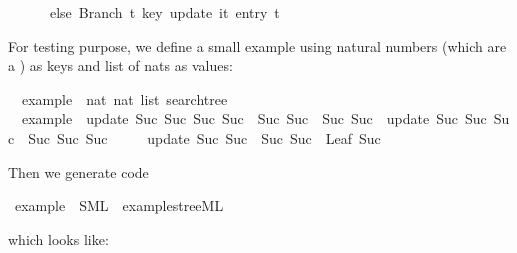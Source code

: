 \begin{isabellebody}
\ \ \ \ \ \ else\ {\isacharparenleft}Branch\ t{}\ key\ {\isacharparenleft}update\ {\isacharparenleft}it{\isacharcomma}\ entry{\isacharparenright}\ t{}{\isacharparenright}{\isacharparenright}\isanewline
\ \ \ {\isacharparenright}{\isachardoublequoteclose}%
\begin{isamarkuptext}%
\noindent For testing purpose, we define a small example
  using natural numbers  (which are a )
  as keys and list of nats as values:%
\end{isamarkuptext}%
\isamarkuptrue%
\isamarkupfalse%
\isanewline
\ \ example\ {\isacharcolon}{\isacharcolon}\ {\isachardoublequoteopen}{\isacharparenleft}nat{\isacharcomma}\ nat\ list{\isacharparenright}\ searchtree{\isachardoublequoteclose}\isanewline
{}\isanewline
\ \ {\isachardoublequoteopen}example\ {\isacharequal}\ update\ {\isacharparenleft}Suc\ {\isacharparenleft}Suc\ {\isacharparenleft}Suc\ {\isacharparenleft}Suc\ {}{\isacharparenright}{\isacharparenright}{\isacharparenright}{\isacharcomma}\ {\isacharbrackleft}Suc\ {\isacharparenleft}Suc\ {}{\isacharparenright}{\isacharcomma}\ Suc\ {\isacharparenleft}Suc\ {}{\isacharparenright}{\isacharbrackright}{\isacharparenright}\ {\isacharparenleft}update\ {\isacharparenleft}Suc\ {\isacharparenleft}Suc\ {\isacharparenleft}Suc\ {}{\isacharparenright}{\isacharparenright}{\isacharcomma}\ {\isacharbrackleft}Suc\ {\isacharparenleft}Suc\ {\isacharparenleft}Suc\ {}{\isacharparenright}{\isacharparenright}{\isacharbrackright}{\isacharparenright}\isanewline
\ \ \ \ {\isacharparenleft}update\ {\isacharparenleft}Suc\ {\isacharparenleft}Suc\ {}{\isacharparenright}{\isacharcomma}\ {\isacharbrackleft}Suc\ {\isacharparenleft}Suc\ {}{\isacharparenright}{\isacharbrackright}{\isacharparenright}\ {\isacharparenleft}Leaf\ {\isacharparenleft}Suc\ {}{\isacharparenright}\ {\isacharbrackleft}{\isacharbrackright}{\isacharparenright}{\isacharparenright}{\isacharparenright}{\isachardoublequoteclose}%
\begin{isamarkuptext}%
\noindent Then we generate code%
\end{isamarkuptext}%
\isamarkuptrue%
\isamarkupfalse%
\ example\ \ SML\ \ {\isachardoublequoteopen}examples{\isacharslash}tree{\isachardot}ML{\isachardoublequoteclose}%
\begin{isamarkuptext}%
\noindent which looks like:

\end{isamarkuptext}
\end{isabellebody}
